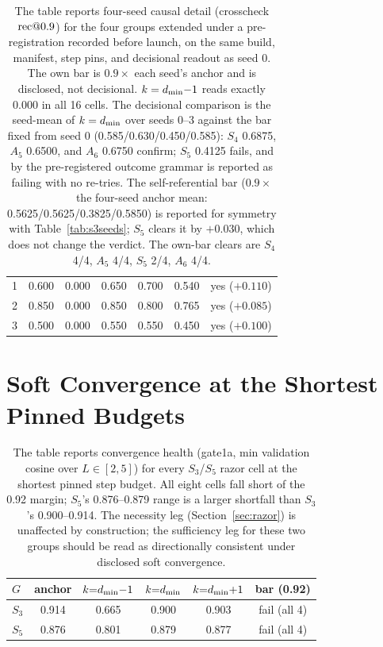 \begin{table}[H]
\begin{tabular}{lcccccc}
1 & 0.600 & 0.000 & 0.650 & 0.700 & 0.540 & yes ($+0.110$) \\
2 & 0.850 & 0.000 & 0.850 & 0.800 & 0.765 & yes ($+0.085$) \\
3 & 0.500 & 0.000 & 0.550 & 0.550 & 0.450 & yes ($+0.100$) \\
\bottomrule
\end{tabular}
\caption{The table reports four-seed causal detail (crosscheck $\mathrm{rec}@0.9$) for the four
groups extended under a pre-registration recorded before launch, on the
same build, manifest, step pins, and decisional readout as seed 0. The
own bar is $0.9\times$ each seed's anchor and is disclosed, not
decisional. $k = d_{\min}{-}1$ reads exactly 0.000 in all 16 cells. The
decisional comparison is the seed-mean of $k = d_{\min}$ over seeds 0--3
against the bar fixed from seed 0 (0.585/0.630/0.450/0.585): $S_4$
0.6875, $A_5$ 0.6500, and $A_6$ 0.6750 confirm; $S_5$ 0.4125 fails, and
by the pre-registered outcome grammar is reported as failing with no
re-tries. The self-referential bar ($0.9\times$ the four-seed anchor
mean: 0.5625/0.5625/0.3825/0.5850) is reported for symmetry with
Table~\ref{tab:s3seeds}; $S_5$ clears it by $+0.030$, which does not
change the verdict. The own-bar clears are $S_4$ 4/4, $A_5$ 4/4, $S_5$ 2/4,
$A_6$ 4/4.}
\label{tab:ext4seeds}
\end{table}

\section{Soft Convergence at the Shortest Pinned Budgets}
\label{app:gate1a}

\begin{table}[H]
\centering
\small
\begin{tabular}{lccccc}
\toprule
$G$ & anchor & $k{=}d_{\min}{-}1$ & $k{=}d_{\min}$ & $k{=}d_{\min}{+}1$ & bar (0.92) \\
\midrule
$S_3$ & 0.914 & 0.665 & 0.900 & 0.903 & fail (all 4) \\
$S_5$ & 0.876 & 0.801 & 0.879 & 0.877 & fail (all 4) \\
\bottomrule
\end{tabular}
\caption{The table reports convergence health (gate1a, min validation cosine
over $L \in [2, 5]$) for every $S_3$/$S_5$ razor cell at the shortest pinned
step budget. All eight cells fall short of the 0.92 margin; $S_5$'s
0.876--0.879 range is a larger shortfall than $S_3$'s 0.900--0.914. The
necessity leg (Section~\ref{sec:razor}) is unaffected by construction; the
sufficiency leg for these two groups should be read as directionally
consistent under disclosed soft convergence.}
\label{tab:gate1a}
\end{table}

